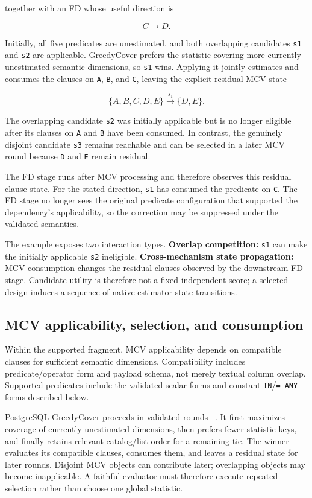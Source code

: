 \documentclass[sigconf,nonacm]{acmart}
\begin{document}
together with an FD whose useful direction is

\[
C\rightarrow D.
\]

Initially, all five predicates are unestimated, and both overlapping candidates \texttt{s1} and \texttt{s2} are applicable. GreedyCover prefers the statistic covering more currently unestimated semantic dimensions, so \texttt{s1} wins. Applying it jointly estimates and consumes the clauses on \texttt{A}, \texttt{B}, and \texttt{C}, leaving the explicit residual MCV state

\[
\{A,B,C,D,E\}\xrightarrow{s_1}\{D,E\}.
\]

The overlapping candidate \texttt{s2} was initially applicable but is no longer eligible after its clauses on \texttt{A} and \texttt{B} have been consumed. In contrast, the genuinely disjoint candidate \texttt{s3} remains reachable and can be selected in a later MCV round because \texttt{D} and \texttt{E} remain residual.

The FD stage runs after MCV processing and therefore observes this residual clause state. For the stated direction, \texttt{s1} has consumed the predicate on \texttt{C}. The FD stage no longer sees the original predicate configuration that supported the dependency's applicability, so the correction may be suppressed under the validated semantics.

The example exposes two interaction types. \textbf{Overlap competition:} \texttt{s1} can make the initially applicable \texttt{s2} ineligible. \textbf{Cross-mechanism state propagation:} MCV consumption changes the residual clauses observed by the downstream FD stage. Candidate utility is therefore not a fixed independent score; a selected design induces a sequence of native estimator state transitions.

\subsection{MCV applicability, selection, and consumption}

Within the supported fragment, MCV applicability depends on compatible clauses for sufficient semantic dimensions. Compatibility includes predicate/operator form and payload schema, not merely textual column overlap. Supported predicates include the validated scalar forms and constant \texttt{IN}/\texttt{= ANY} forms described below.

PostgreSQL GreedyCover proceeds in validated rounds ~\cite{postgresql16source}. It first maximizes coverage of currently unestimated dimensions, then prefers fewer statistic keys, and finally retains relevant catalog/list order for a remaining tie. The winner evaluates its compatible clauses, consumes them, and leaves a residual state for later rounds. Disjoint MCV objects can contribute later; overlapping objects may become inapplicable. A faithful evaluator must therefore execute repeated selection rather than choose one global statistic.
\end{document}

